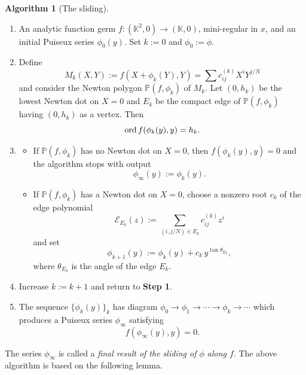 \documentclass[reqno, 12pt ,a4letter]{amsart}
\theoremstyle{definition}
\newtheorem {algorithm}{Algorithm}[section]
\newcommand{\ord}{\operatornamewithlimits{ord}}
\begin{document}
\begin{algorithm}[The sliding]\quad
\begin{enumerate}
    \item[\textbf{Input.}]
An analytic function germ $f:(\mathbb{K}^2,0)\to(\mathbb{K},0)$, mini-regular in $x$, and an initial Puiseux series $\phi_0(y)$. Set $k:=0$ and $\phi_0:=\phi$.

	\item[\textbf{Step 1.}] Define $$M_k(X,Y):=f(X+\phi_k(Y),Y) =\sum c^{(k)}_{ij}X^iY^{j/N}$$ and consider the Newton polygon $\mathbb{P}(f,\phi_k)$ of $M_k$. Let $(0,h_k)$ be the lowest Newton dot on $X=0$ and $E_k$ be the compact edge of $\mathbb{P}(f,\phi_k)$ having $(0,h_k)$ as a vertex. Then $$\ord f(\phi_k(y),y)=h_k.$$	
	\item[\textbf{Step 2.}]
	\begin{itemize}
	    \item If $\mathbb{P}(f,\phi_k)$ has no Newton dot on $X=0$, then $f(\phi_k(y),y)=0$ and the algorithm stops with output $$\phi_\infty(y):=\phi_k(y).$$
        \item If $\mathbb{P}(f,\phi_k)$ has a Newton dot on $X=0$, choose a nonzero root $c_k$ of the edge polynomial
	\[
	\mathcal{E}_{E_k}(z)
	:=\sum_{(i,j/N)\in E_k} c^{(k)}_{ij} z^i
	\] and set
	\[
	\phi_{k+1}(y)
	:=\phi_k(y)+c_k\,y^{\tan\theta_{E_k}},
	\]
	where $\theta_{E_k}$ is the angle of the edge $E_k$.
	\end{itemize}
	\item[\textbf{Step 3.}]
	Increase $k:=k+1$ and return to \textbf{Step 1}.
    \item[\textbf{Output.}] The sequence $\{\phi_k(y)\}_k$ has diagram $\phi_0 \rightarrow \phi_1 \rightarrow \cdots\rightarrow \phi_k \rightarrow \cdots$ which produces a Puiseux series $\phi_\infty$ satisfying
\[
f(\phi_\infty(y),y)=0.
\]
\end{enumerate}
\end{algorithm}
The series $\phi_\infty$ is called a {\it final result of the sliding of $\phi$ along $f$}. %
The above algorithm is based on the following lemma.
\end{document}
